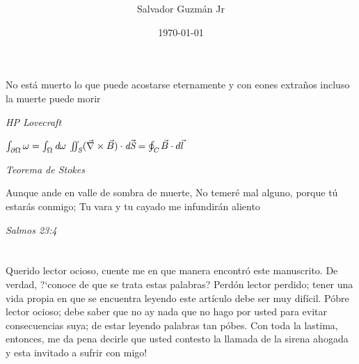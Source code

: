 \documentclass{article}
\begin{document}
	\title{
		\Large{
		}
	}
	
	\author{Salvador Guzm\'{a}n Jr}
	\date{\today}
	\maketitle
	
	\pagebreak
	\begin{center}
		\thispagestyle{empty}
		\vspace*{\fill}
					\textbf{
		}
		
		\vspace*{\fill}
	\end{center}
	\pagebreak
	\begin{center}
		\epigraph{
			No est\'{a} muerto lo que puede acostarse eternamente
			y con eones extraños  incluso la muerte
			puede morir
		}{\textit{
			HP Lovecraft
		}}
		\epigraph{
			\begin{math}
				\int_{\partial\Omega} \omega=\int_{\Omega} \emph{d}\omega
			\end{math}
			\linebreak
			\linebreak
			\begin{math}
				\iint_{\emph{S}}(\vec{\nabla}\times\vec{B})\cdot \emph{d}\vec{\emph{S}}=\oint_{\emph{C}}\vec{B}\cdot d \vec{l}
			\end{math}
		}{
			\textit{Teorema de Stokes}
		}

		\epigraph{
			Aunque ande en valle de sombra de muerte,
			No temer\'{e} mal alguno, porque t\'{u} estarás conmigo;
			Tu vara y tu cayado me infundir\'{a}n aliento
		}{
			\textit{Salmos 23:4}
		}
	\end{center}
	\pagebreak
	\tableofcontents
	\pagebreak
	
	\section{\Large{}}
	\subsection{}
	Querido lector ocioso, cuente me en que manera encontr\'{o} este manuscrito. De verdad, \mbox{?`}conoce de que se trata estas palabras? Perd\'{o}n lector perdido; tener una vida propia en que se encuentra leyendo este art\'{i}culo debe ser muy difícil. P\'{o}bre lector ocioso; debe saber que no ay nada que no hago por usted para evitar consecuencias suya; de estar leyendo palabras tan p\'{o}bes. Con toda la lastima, entonces, me da pena decirle que usted contesto la llamada de la sirena ahogada y esta invitado a sufrir con migo!
\end{document}
